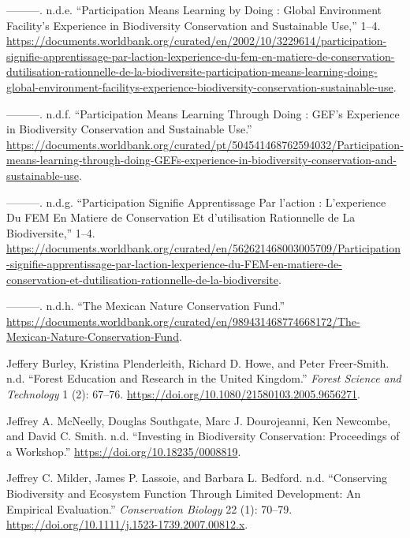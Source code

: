 \begin{CSLReferences}{1}{0}
---------. n.d.e. {``Participation Means Learning by Doing : Global
Environment Facility's Experience in Biodiversity Conservation and
Sustainable Use,''} 1--4.
\url{https://documents.worldbank.org/curated/en/2002/10/3229614/participation-signifie-apprentissage-par-laction-lexperience-du-fem-en-matiere-de-conservation-dutilisation-rationnelle-de-la-biodiversite-participation-means-learning-doing-global-environment-facilitys-experience-biodiversity-conservation-sustainable-use}.

---------. n.d.f. {``Participation Means Learning Through Doing : GEF's
Experience in Biodiversity Conservation and Sustainable Use.''}
\url{https://documents.worldbank.org/curated/pt/504541468762594032/Participation-means-learning-through-doing-GEFs-experience-in-biodiversity-conservation-and-sustainable-use}.

---------. n.d.g. {``Participation Signifie Apprentissage Par l'action :
L'experience Du FEM En Matiere de Conservation Et d'utilisation
Rationnelle de La Biodiversite,''} 1--4.
\url{https://documents.worldbank.org/curated/en/562621468003005709/Participation-signifie-apprentissage-par-laction-lexperience-du-FEM-en-matiere-de-conservation-et-dutilisation-rationnelle-de-la-biodiversite}.

---------. n.d.h. {``The Mexican Nature Conservation Fund.''}
\url{https://documents.worldbank.org/curated/en/989431468774668172/The-Mexican-Nature-Conservation-Fund}.

Jeffery Burley, Kristina Plenderleith, Richard D. Howe, and Peter
Freer‐Smith. n.d. {``Forest Education and Research in the United
Kingdom.''} \emph{Forest Science and Technology} 1 (2): 67--76.
\url{https://doi.org/10.1080/21580103.2005.9656271}.

Jeffrey A. McNeelly, Douglas Southgate, Marc J. Dourojeanni, Ken
Newcombe, and David C. Smith. n.d. {``Investing in Biodiversity
Conservation: Proceedings of a Workshop.''}
\url{https://doi.org/10.18235/0008819}.

Jeffrey C. Milder, James P. Lassoie, and Barbara L. Bedford. n.d.
{``Conserving Biodiversity and Ecosystem Function Through Limited
Development: An Empirical Evaluation.''} \emph{Conservation Biology} 22
(1): 70--79. \url{https://doi.org/10.1111/j.1523-1739.2007.00812.x}.


\end{CSLReferences}
